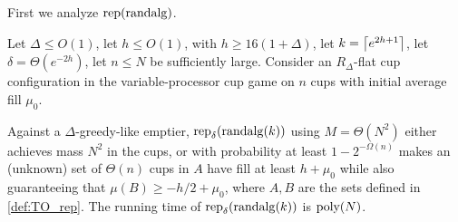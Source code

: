 First we analyze $\operatorname{\text{\textup{rep}}}(\operatorname{\text{\textup{randalg}}})$.
\begin{lemma}
  \label{lem:TO_obliviousManyUnknownCups}
  Let $\Delta \le O(1)$, let $h\le O(1)$, with $h \ge
  16(1+\Delta)$, let $k=\left\lceil e^{2h+1} \right\rceil$, let $\delta =
  \Theta(e^{-2h})$, let $n\le N$ be sufficiently large. 
  Consider an $R_\Delta$-flat cup configuration in the
  variable-processor cup game on $n$ cups with initial average
  fill $\mu_0$.

  Against a $\Delta$-greedy-like emptier,
  $\operatorname{\text{\textup{rep}}}_{\delta}(\operatorname{\text{\textup{randalg}}}(k))$ using $M = \Theta(N^2)$
  either achieves mass $N^2$ in the cups, or with probability at
  least $1-2^{-\Omega(n)}$ makes an (unknown) set of $\Theta(n)$
  cups in $A$ have fill at least $h+\mu_0$ while also
  guaranteeing that $\mu(B) \ge -h/2 + \mu_0$, where $A,B$ are
  the sets defined in \cref{def:TO_rep}. The running time of
  $\operatorname{\text{\textup{rep}}}_{\delta}(\operatorname{\text{\textup{randalg}}}(k))$ is $\operatorname{\text{poly}}(N)$.
\end{lemma}
